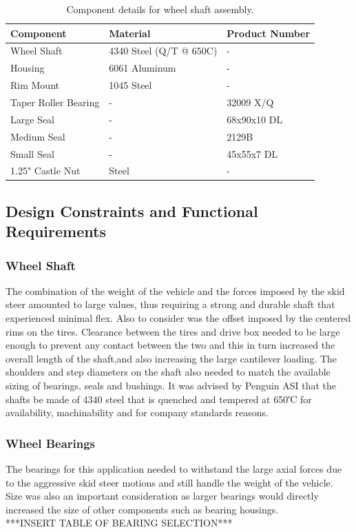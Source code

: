 \begin{table}[htbp]
	\centering
	\caption{Component details for wheel shaft assembly.}
	\begin{tabular}{| lll |} \hline
		Component & Material & Product Number \\ \hline
		Wheel Shaft & 4340 Steel (Q/T @ 650\degree C) & - \\
		Housing & 6061 Aluminum & - \\
		Rim Mount & 1045 Steel & - \\
		Taper Roller Bearing & - & 32009 X/Q \\
		Large Seal & - & 68x90x10 DL \\
		Medium Seal & - & 2129B \\
		Small Seal & - & 45x55x7 DL \\
		1.25" Castle Nut & Steel & - \\ \hline
	\end{tabular}
	\label{tab:design_spec}
\end{table}


\subsection{Design Constraints and Functional Requirements}
\subsubsection{Wheel Shaft}
The combination of the weight of the vehicle and the forces imposed by the skid steer amounted to large values, thus requiring a strong and durable shaft that experienced minimal flex. Also to consider was the offset imposed by the centered rims on the tires. Clearance between the tires and drive box needed to be large enough to prevent any contact between the two and this in turn increased the overall length of the shaft,and also increasing the large cantilever loading. The shoulders and step diameters on the shaft also needed to match the available sizing of bearings, seals and bushings. It was advised by Penguin ASI that the shafts be made of 4340 steel that is quenched and tempered at 650℃ for availability, machinability and for company standards reasons.

\subsubsection{Wheel Bearings}
The bearings for this application needed to withstand the large axial forces due to the aggressive skid steer motions and still handle the weight of the vehicle. Size was also an important consideration as larger bearings would directly increased the size of other components such as bearing housings.
\\
***INSERT TABLE OF BEARING SELECTION***
\\

